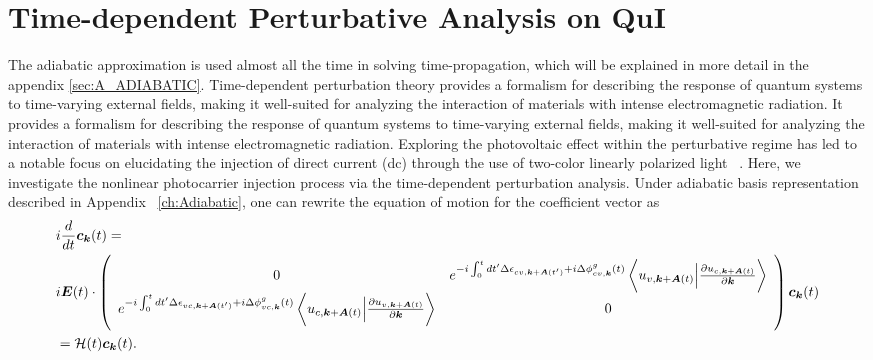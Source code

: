 \section{Time-dependent Perturbative Analysis on QuI \label{sec:deriveperturbation}}
The adiabatic approximation is used almost all the time in solving time-propagation, which will be explained in more detail in the appendix \ref{sec:A_ADIABATIC}.
Time-dependent perturbation theory provides a formalism for describing the response of quantum systems to time-varying external fields, making it well-suited for analyzing the interaction of materials with intense electromagnetic radiation. It provides a formalism for describing the response of quantum systems to time-varying external fields, making it well-suited for analyzing the interaction of materials with intense electromagnetic radiation. 
Exploring the photovoltaic effect within the perturbative regime has led to a notable focus on elucidating the injection of direct current (dc) through the use of two-color linearly polarized light ~\cite{PhysRevLett.74.3596,PhysRevLett.76.1703,PhysRevLett.78.306,Sun2010,PhysRevB.100.075202,HeideBoolakeeEcksteinHommelhoff+2021+3701+3707,PhysRevLett.123.067402}. 
Here, we investigate the nonlinear photocarrier injection process via the time-dependent perturbation analysis.
Under adiabatic basis representation described in Appendix ~\ref{ch:Adiabatic}, one can rewrite the equation of motion for the coefficient vector as
\begin{align}
&i\frac{d}{dt} \boldsymbol c_{\boldsymbol k}(t) = 
 \nonumber \\
& i\boldsymbol E(t)\cdot \left(
    \begin{array}{cc}
      0 & 
      e^{-i\int^t_0dt' \Delta \epsilon_{cv,\boldsymbol k+ \boldsymbol A(t')}+i \Delta \phi^g_{cv,\boldsymbol k}(t)} 
  \left \langle u_{v,\boldsymbol k+\boldsymbol A(t)}\Big |\frac{\partial u_{c,\boldsymbol k+\boldsymbol A(t)}}{\partial \boldsymbol k} \right \rangle \\
      e^{-i\int^t_0dt' \Delta \epsilon_{vc,\boldsymbol k+ \boldsymbol A(t')}+i \Delta \phi^g_{vc,\boldsymbol k}(t)} 
  \left \langle u_{c,\boldsymbol k+\boldsymbol A(t)}\Big |\frac{\partial u_{v,\boldsymbol k+\boldsymbol A(t)}}{\partial \boldsymbol k} \right \rangle &
      0
    \end{array}
    \right) \boldsymbol c_{\boldsymbol k}(t) \nonumber \\
&= \mathcal{H}(t) \boldsymbol c_{\boldsymbol k}(t)
.
\label{eq:tdse-ad-basis}
\end{align}

